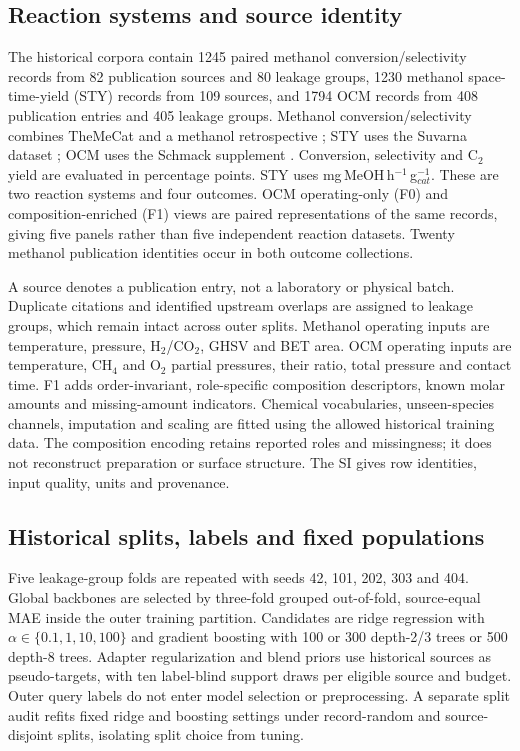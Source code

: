 \documentclass[11pt]{article}
\newcommand{\styunit}{mg\,MeOH\,h$^{-1}$\,g$_{cat}^{-1}$}
\begin{document}
\subsection{Reaction systems and source identity}
The historical corpora contain 1245 paired methanol conversion/selectivity records from 82 publication sources and 80 leakage groups, 1230 methanol space-time-yield (STY) records from 109 sources, and 1794 OCM records from 408 publication entries and 405 leakage groups. Methanol conversion/selectivity combines TheMeCat and a methanol retrospective \cite{toldy,yan}; STY uses the Suvarna dataset \cite{suvarna}; OCM uses the Schmack supplement \cite{schmack}. Conversion, selectivity and C$_2$ yield are evaluated in percentage points. STY uses \styunit. These are two reaction systems and four outcomes. OCM operating-only (F0) and composition-enriched (F1) views are paired representations of the same records, giving five panels rather than five independent reaction datasets. Twenty methanol publication identities occur in both outcome collections.

A source denotes a publication entry, not a laboratory or physical batch. Duplicate citations and identified upstream overlaps are assigned to leakage groups, which remain intact across outer splits. Methanol operating inputs are temperature, pressure, H$_2$/CO$_2$, GHSV and BET area. OCM operating inputs are temperature, CH$_4$ and O$_2$ partial pressures, their ratio, total pressure and contact time. F1 adds order-invariant, role-specific composition descriptors, known molar amounts and missing-amount indicators. Chemical vocabularies, unseen-species channels, imputation and scaling are fitted using the allowed historical training data. The composition encoding retains reported roles and missingness; it does not reconstruct preparation or surface structure. The SI gives row identities, input quality, units and provenance.

\subsection{Historical splits, labels and fixed populations}
Five leakage-group folds are repeated with seeds 42, 101, 202, 303 and 404. Global backbones are selected by three-fold grouped out-of-fold, source-equal MAE inside the outer training partition. Candidates are ridge regression with $\alpha\in\{0.1,1,10,100\}$ and gradient boosting with 100 or 300 depth-2/3 trees or 500 depth-8 trees. Adapter regularization and blend priors use historical sources as pseudo-targets, with ten label-blind support draws per eligible source and budget. Outer query labels do not enter model selection or preprocessing. A separate split audit refits fixed ridge and boosting settings under record-random and source-disjoint splits, isolating split choice from tuning.
\end{document}
